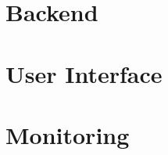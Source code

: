 %


\section{Backend}
\label{s:microservices}




%

\section{User Interface}
\label{s:user-interface}


\section{Monitoring}
\label{s:monitoring}




%